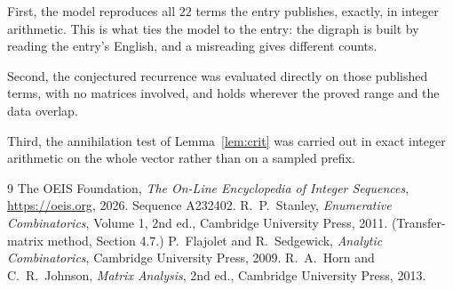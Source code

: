 \documentclass[11pt,a4paper]{article}
\theoremstyle{plain}
\theoremstyle{definition}
\begin{document}
First, the model reproduces all $22$ terms the entry publishes, exactly, in integer
arithmetic. This is what ties the model to the entry: the digraph is built by reading the
entry's English, and a misreading gives different counts.

Second, the conjectured recurrence was evaluated directly on those published terms, with no
matrices involved, and holds wherever the proved range and the data overlap.

Third, the annihilation test of Lemma~\ref{lem:crit} was carried out in exact integer
arithmetic on the whole vector rather than on a sampled prefix.

\begin{thebibliography}{9}
 The OEIS Foundation, \emph{The On-Line Encyclopedia of Integer
Sequences}, \url{https://oeis.org}, 2026. Sequence A232402.
 R.~P.~Stanley, \emph{Enumerative Combinatorics}, Volume 1, 2nd ed.,
Cambridge University Press, 2011. (Transfer-matrix method, Section 4.7.)
 P.~Flajolet and R.~Sedgewick, \emph{Analytic Combinatorics}, Cambridge
University Press, 2009.
 R.~A.~Horn and C.~R.~Johnson, \emph{Matrix Analysis}, 2nd ed., Cambridge
University Press, 2013.
\end{thebibliography}
\end{document}
